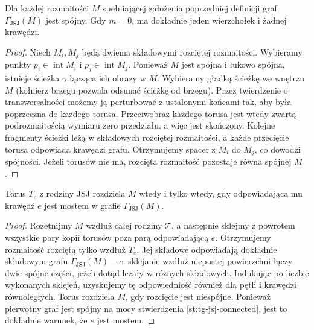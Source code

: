 \begin{stwierdzenie}
\label{st:tg-jsj-connected}
Dla każdej rozmaitości $M$ spełniającej założenia
poprzedniej definicji graf $\Gamma_{\mathrm{JSJ}}(M)$
jest spójny. Gdy $m=0$, ma dokładnie jeden
wierzchołek i żadnej krawędzi.
\end{stwierdzenie}
\begin{proof}
Niech $M_i,M_j$ będą dwiema składowymi rozciętej
rozmaitości. Wybieramy punkty $p_i\in\operatorname{int}M_i$
i $p_j\in\operatorname{int}M_j$. Ponieważ $M$ jest
spójna i łukowo spójna, istnieje ścieżka $\gamma$
łącząca ich obrazy w $M$. Wybieramy gładką ścieżkę we wnętrzu $M$ (kołnierz
brzegu pozwala odsunąć ścieżkę od brzegu).
Przez twierdzenie o transwersalności możemy ją
perturbować z ustalonymi końcami tak, aby była
poprzeczna do każdego torusa. Przeciwobraz każdego
torusa jest wtedy zwartą podrozmaitością wymiaru
zero przedziału, a więc jest skończony. Kolejne fragmenty
ścieżki leżą w składowych rozciętej rozmaitości,
a każde przecięcie torusa odpowiada krawędzi grafu.
Otrzymujemy spacer z $M_i$ do $M_j$, co dowodzi
spójności. Jeżeli torusów nie ma, rozcięta
rozmaitość pozostaje równa spójnej $M$.
\end{proof}

\begin{stwierdzenie}
\label{st:tg-jsj-bridge}
Torus $T_e$ z rodziny JSJ rozdziela $M$ wtedy
i tylko wtedy, gdy odpowiadająca mu krawędź $e$
jest mostem w grafie $\Gamma_{\mathrm{JSJ}}(M)$.
\end{stwierdzenie}
\begin{proof}
Rozetnijmy $M$ wzdłuż całej rodziny $\mathcal T$,
a następnie sklejmy z powrotem wszystkie pary
kopii torusów poza parą odpowiadającą $e$.
Otrzymujemy rozmaitość rozciętą tylko wzdłuż $T_e$.
Jej składowe odpowiadają dokładnie składowym grafu
$\Gamma_{\mathrm{JSJ}}(M)-e$: sklejanie wzdłuż
niepustej powierzchni łączy dwie spójne części,
jeżeli dotąd leżały w różnych składowych.
Indukując po liczbie wykonanych sklejeń, uzyskujemy
tę odpowiedniość również dla pętli i krawędzi
równoległych. Torus rozdziela $M$, gdy rozcięcie
jest niespójne. Ponieważ pierwotny graf jest spójny
na mocy stwierdzenia \ref{st:tg-jsj-connected},
jest to dokładnie warunek, że $e$ jest mostem.
\end{proof}

\begin{center}
\end{center}

